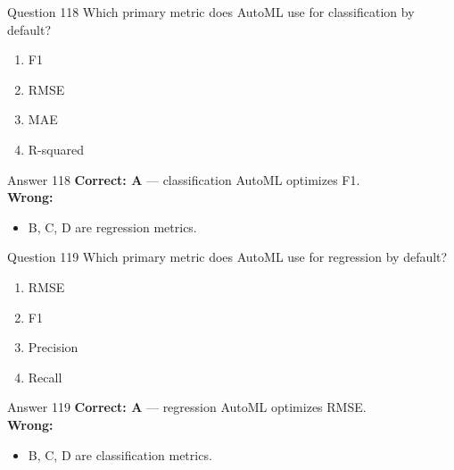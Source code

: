 \documentclass[aspectratio=169,11pt]{beamer}
\begin{document}
	\begin{frame}{Question 118}
		Which primary metric does AutoML use for classification by default?
		\begin{enumerate}[label=\Alph*.]
			\item F1
			\item RMSE
			\item MAE
			\item R-squared
		\end{enumerate}
	\end{frame}
	\begin{frame}{Answer 118}
		\textbf{Correct: A} --- classification AutoML optimizes F1.\\
		\vspace{0.5em}
		\textbf{Wrong:}
		\begin{itemize}
			\item B, C, D are regression metrics.
		\end{itemize}
	\end{frame}
	
	\begin{frame}{Question 119}
		Which primary metric does AutoML use for regression by default?
		\begin{enumerate}[label=\Alph*.]
			\item RMSE
			\item F1
			\item Precision
			\item Recall
		\end{enumerate}
	\end{frame}
	\begin{frame}{Answer 119}
		\textbf{Correct: A} --- regression AutoML optimizes RMSE.\\
		\vspace{0.5em}
		\textbf{Wrong:}
		\begin{itemize}
			\item B, C, D are classification metrics.
		\end{itemize}
	\end{frame}
	
\end{document}
